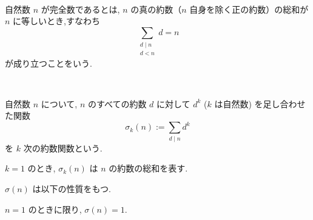 %

\begin{definition}[完全数]\label{perfect}\leanok~\

自然数 \(n\) が完全数であるとは, \(n\) の真の約数（\(n\) 自身を除く正の約数）の総和が \(n\) に等しいとき,すなわち
\[
\sum_{\substack{d \mid n\\ d < n}} d = n
\]
\;\;\;が成り立つことをいう.

\end{definition}


\begin{definition}[約数関数]\label{sigma_div}\leanok~\

自然数 \(n\) について, \(n\) のすべての約数 \(d\) に対して \(d^k\) (\(k\) は自然数) を足し合わせた関数
\[
\sigma_k(n) := \sum_{d \mid n} d^k
\]
\;\;\;を \(k\) 次の約数関数という.%

\end{definition}



\begin{lemma}\label{sigma_one_apply}\leanok{}

\(k = 1\) のとき, \(\sigma_k(n)\) は \(n\) の約数の総和を表す.

\end{lemma}



\vspace{0.5\baselineskip}

\(\sigma(n)\) は以下の性質をもつ.

\begin{lemma}\label{one_iff_sum_divisors_eq_one}
  \leanok{}

\(n = 1\) のときに限り, \(\sigma(n) = 1\).

\end{lemma}

